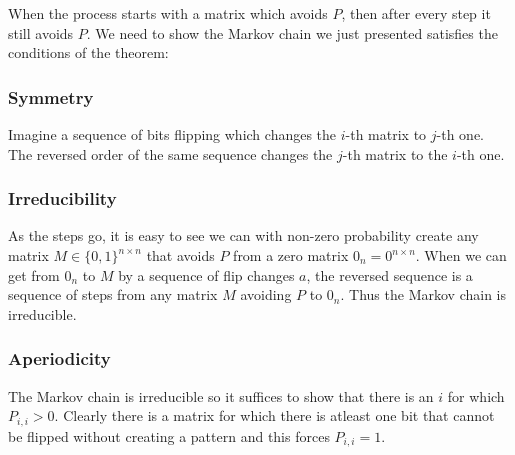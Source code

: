 When the process starts with a matrix which avoids $P$, then after every step it still avoids $P$. We need to show the Markov chain we just presented satisfies the conditions of the theorem:
\subsubsection{Symmetry}
Imagine a sequence of bits flipping which changes the $i$-th matrix to $j$-th one. The reversed order of the same sequence changes the $j$-th matrix to the $i$-th one.
\subsubsection{Irreducibility}
As the steps go, it is easy to see we can with non-zero probability create any matrix $M\in\{0,1\}^{n\times n}$ that avoids $P$ from a zero matrix $0_n=0^{n\times n}$. When we can get from $0_n$ to $M$ by a sequence of flip changes $a$, the reversed sequence is a sequence of steps from any matrix $M$ avoiding $P$ to $0_n$. Thus the Markov chain is irreducible.
\subsubsection{Aperiodicity}
The Markov chain is irreducible so it suffices to show that there is an $i$ for which $P_{i,i}>0$. Clearly there is a matrix for which there is atleast one bit that cannot be flipped without creating a pattern and this forces $P_{i,i}=1$.